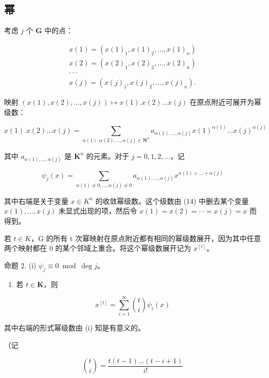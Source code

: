 \subsection{幂}

考虑 \(j\) 个 \(\mathbf{G}\) 中的点：

\[
\begin{array}{l} x (1) = (x (1) _ {1}, x (1) _ {2}, \ldots , x (1) _ {n}) \\ x (2) = (x (2) _ {1}, x (2) _ {2}, \ldots , x (2) _ {n}) \\ \cdot \cdot \cdot \\ x (j) = (x (j) _ {1}, x (j) _ {2}, \ldots , x (j) _ {n}). \end{array}
\]

映射 \((x(1), x(2), \ldots, x(j)) \mapsto x(1).x(2) \ldots x(j)\) 在原点附近可展开为幂级数：

\[
x (1). x (2) \dots x (j) = \sum_ {\alpha (1), \alpha (2), \dots , \alpha (j) \in \mathbf {N} ^ {n}} a _ {\alpha (1), \dots , \alpha (j)} x (1) ^ {\alpha (1)} \dots x (j) ^ {\alpha (j)}\tag{14}
\]

其中 \(a_{\alpha(1), \ldots, \alpha(j)}\) 是 \(\mathbf{K}^n\) 的元素。对于 \(j = 0, 1, 2, \ldots\)，记

\[
\psi_ {j} (x) = \sum_ {\alpha (1) \neq 0, \dots , \alpha (j) \neq 0} a _ {\alpha (1), \dots , \alpha (j)} x ^ {\alpha (1) + \dots + \alpha (j)}\tag{15}
\]

其中右端是关于变量 \(x \in K^{n}\) 的收敛幂级数。这个级数由 (14) 中删去某个变量 \(x(1), \ldots, x(j)\) 未显式出现的项，然后令 \(x(1) = x(2) = \cdots = x(j) = x\) 而得到。

若 \(t \in K\)，G 的所有 t 次幂映射在原点附近都有相同的幂级数展开，因为其中任意两个映射都在 0 的某个邻域上重合。将这个幂级数展开记为 \(x^{[t]}\)。

命题 2. (i) \(\psi_{j} \equiv 0 \bmod \deg j\)。

\begin{enumerate}
\def\labelenumi{(\roman{enumi})}
\setcounter{enumi}{1}
\tightlist
\item
  若 \(t\in \mathbf{K}\)，则
\end{enumerate}

\[
x ^ {[ t ]} = \sum_ {i = 1} ^ {\infty} \binom {t} {i} \psi_ {i} (x)\tag{16}
\]

其中右端的形式幂级数由 (i) 知是有意义的。

（记

\[
\binom {t} {i} = \frac {t (t - 1) \dots (t - i + 1)}{i !}
\]

